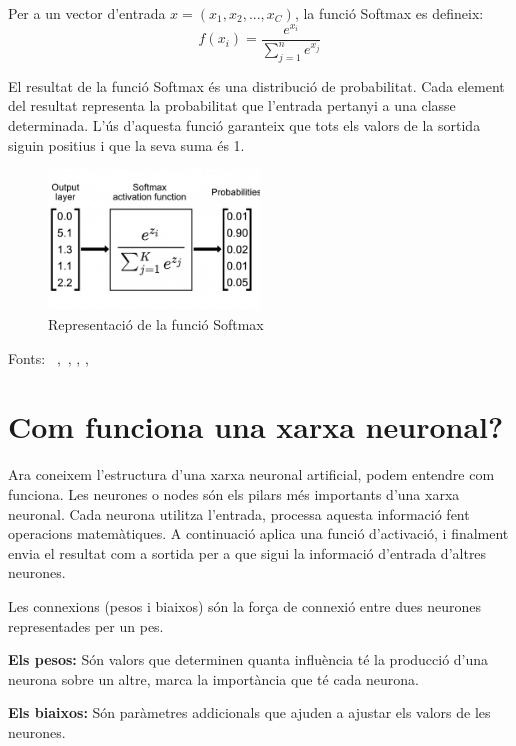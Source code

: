 \begin{enumerate}
    Per a un vector d'entrada $x =  \left( x_1,x_2 , ... , x_C \right)$, la funció Softmax es defineix:
    $$f(x_i) = \frac{e^{x_i}}{\sum_{j=1}^{n} e^{x_j}}$$

    El resultat de la funció Softmax és una distribució de probabilitat. Cada element del resultat representa la probabilitat que l'entrada pertanyi a una classe determinada. L'ús d'aquesta funció garanteix que tots els valors de la sortida siguin positius i que la seva suma és 1.

    \begin{figure}[h!]
        \centering
        \includegraphics[width=0.5\textwidth]{./figures/representacio_Softmax.png}
        \caption{Representació de la funció Softmax}
    \end{figure}
\end{enumerate}

Fonts: ~\cite{Hidden_layer},~\cite{Jacar}, \cite{FuncioD'activació}, \cite{Softmax}, \cite{datacamp}

\section{Com funciona una xarxa neuronal?}\label{sec:3.8}

Ara coneixem l'estructura d'una xarxa neuronal artificial, podem entendre com funciona. Les neurones o nodes són els pilars més importants d'una xarxa neuronal. Cada neurona utilitza l'entrada, processa aquesta informació fent operacions matemàtiques. A continuació aplica una funció d'activació, i finalment envia el resultat com a sortida per a que sigui la informació d'entrada d'altres neurones.

Les connexions (pesos i biaixos) són la força de connexió entre dues neurones representades per un pes.

\textbf{Els pesos:} Són valors que determinen quanta influència té la producció d'una neurona sobre un altre, marca la importància que té cada neurona.

\textbf{Els biaixos:} Són paràmetres addicionals que ajuden a ajustar els valors de les neurones.

